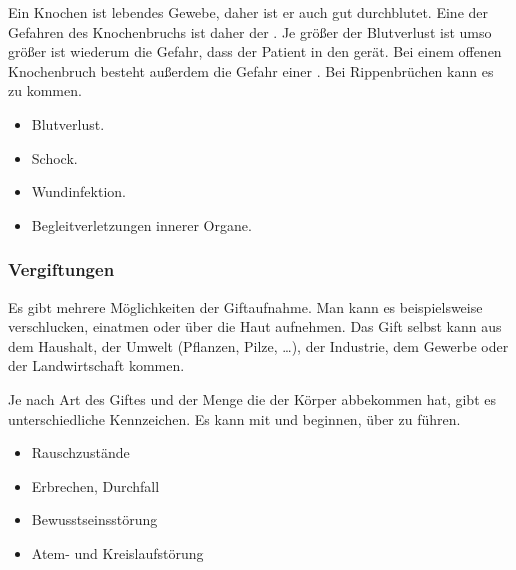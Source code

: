 {
Ein Knochen ist lebendes
Gewebe, daher ist er auch gut durchblutet. Eine der Gefahren des
Knochenbruchs ist daher der . Je größer der Blutverlust ist
umso größer ist wiederum die Gefahr, dass der Patient in den 
gerät. Bei einem offenen Knochenbruch besteht außerdem die Gefahr einer . Bei Rippenbrüchen kann
es zu  kommen. 
}{
\begin{itemize}
    \item Blutverlust.
    \item Schock.
    \item Wundinfektion.
    \item Begleitverletzungen innerer Organe.
\end{itemize}
}{}{}{}


\subsubsection{Vergiftungen}

{
Es gibt mehrere Möglichkeiten der Giftaufnahme. Man kann
es beispielsweise verschlucken, einatmen oder über die Haut aufnehmen. Das Gift
selbst kann aus dem Haushalt, der Umwelt (Pflanzen, Pilze, \ldots), der
Industrie, dem Gewerbe oder der Landwirtschaft kommen.
}{
}{}{}{}

{
Je nach Art des Giftes und der Menge die der Körper abbekommen hat, gibt es
unterschiedliche Kennzeichen. Es kann mit  und
 beginnen, über  zu
 führen.
}{
\begin{itemize}
    \item Rauschzustände
    \item Erbrechen, Durchfall
    \item Bewusstseinsstörung
    \item Atem- und Kreislaufstörung
\end{itemize}
}{}{}{}

